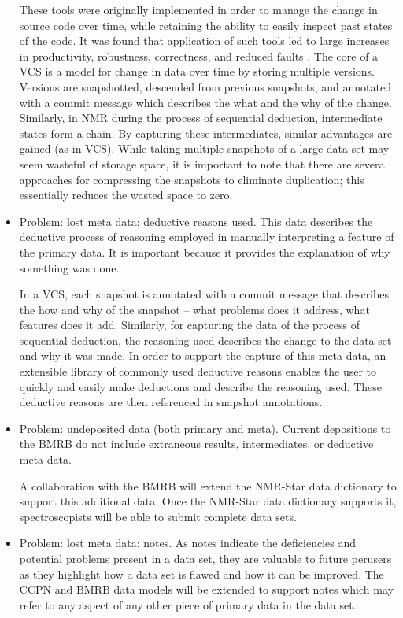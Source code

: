 \begin{itemize}
These tools were originally implemented in order to manage the change in 
source code over time, while retaining the ability to easily inspect past 
states of the code.  It was found that application of such tools led to 
large increases in productivity, robustness, correctness, and reduced 
faults \cite{fischer2003vcs}.  The core of a VCS is a model for change in data 
over time by storing multiple versions.  Versions are snapshotted, 
descended from previous snapshots, and annotated with a commit message 
which describes the what and the why of the change.  Similarly, in NMR 
during the process of sequential deduction, intermediate states form a 
chain.  By capturing these intermediates, similar advantages are gained 
(as in VCS).  While taking multiple snapshots of a large data set may 
seem wasteful of storage space, it is important to note that there are 
several approaches for compressing the snapshots to eliminate duplication; 
this essentially reduces the wasted space to zero.

  \item Problem: lost meta data: deductive reasons used.  This data describes the 
deductive process of reasoning employed in manually interpreting a feature 
of the primary data.  It is important because it provides the explanation 
of why something was done.

In a VCS, each snapshot is annotated with a commit message that describes 
the how and why of the snapshot -- what problems does it address, what 
features does it add.  Similarly, for capturing the data of the process of 
sequential deduction, the reasoning used describes the change to the data 
set and why it was made.  In order to support the capture of this meta data, 
an extensible library of commonly used deductive reasons enables the user to 
quickly and easily make deductions and describe the reasoning used.  These 
deductive reasons are then referenced in snapshot annotations.

  \item Problem: undeposited data (both primary and meta).  Current depositions to 
the BMRB do not include extraneous results, intermediates, or deductive meta 
data.  

A collaboration with the BMRB will extend the NMR-Star data dictionary to 
support this additional data.  Once the NMR-Star data dictionary supports 
it, spectroscopists will be able to submit complete data sets.

  \item Problem: lost meta data: notes.  As notes indicate the deficiencies and 
potential problems present in a data set, they are valuable to future 
perusers as they highlight how a data set is flawed and how it can be improved.
The CCPN and BMRB data models will be extended to support notes which may 
refer to any aspect of any other piece of primary data in the data set.
\end{itemize}

